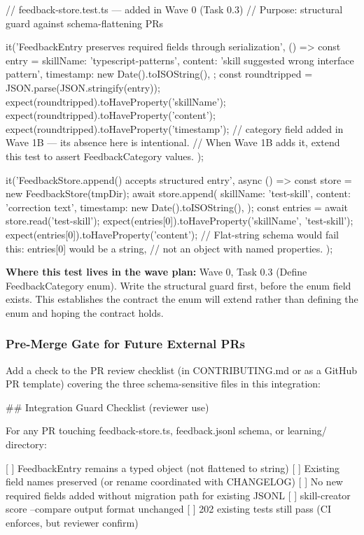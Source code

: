 \documentclass[11pt,letterpaper]{article}
\begin{document}
\begin{asciibox}
  // feedback-store.test.ts — added in Wave 0 (Task 0.3)
  // Purpose: structural guard against schema-flattening PRs

  it('FeedbackEntry preserves required fields through serialization', () => {
    const entry = {
      skillName:  'typescript-patterns',
      content:    'skill suggested wrong interface pattern',
      timestamp:  new Date().toISOString(),
    };
    const roundtripped = JSON.parse(JSON.stringify(entry));
    expect(roundtripped).toHaveProperty('skillName');
    expect(roundtripped).toHaveProperty('content');
    expect(roundtripped).toHaveProperty('timestamp');
    // category field added in Wave 1B — its absence here is intentional.
    // When Wave 1B adds it, extend this test to assert FeedbackCategory values.
  });

  it('FeedbackStore.append() accepts structured entry', async () => {
    const store = new FeedbackStore(tmpDir);
    await store.append({
      skillName: 'test-skill',
      content:   'correction text',
      timestamp: new Date().toISOString(),
    });
    const entries = await store.read('test-skill');
    expect(entries[0]).toHaveProperty('skillName', 'test-skill');
    expect(entries[0]).toHaveProperty('content');
    // Flat-string schema would fail this: entries[0] would be a string,
    // not an object with named properties.
  });
\end{asciibox}

\textbf{Where this test lives in the wave plan:} Wave 0, Task 0.3 (Define FeedbackCategory enum). Write the structural guard first, before the enum field exists. This establishes the contract the enum will extend rather than defining the enum and hoping the contract holds.

\subsubsection{Pre-Merge Gate for Future External PRs}

Add a check to the PR review checklist (in CONTRIBUTING.md or as a GitHub PR template) covering the three schema-sensitive files in this integration:

\begin{asciibox}
  \#\# Integration Guard Checklist (reviewer use)

  For any PR touching feedback-store.ts, feedback.jsonl schema,
  or learning/ directory:

  [ ] FeedbackEntry remains a typed object (not flattened to string)
  [ ] Existing field names preserved (or rename coordinated with CHANGELOG)
  [ ] No new required fields added without migration path for existing JSONL
  [ ] skill-creator score --compare output format unchanged
  [ ] 202 existing tests still pass (CI enforces, but reviewer confirm)
\end{asciibox}
\end{document}
